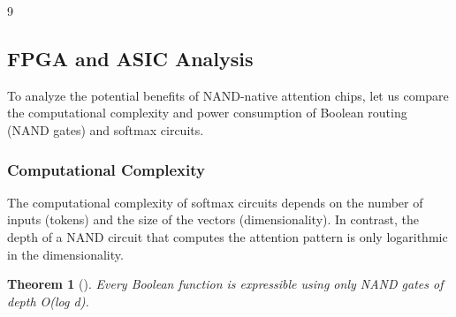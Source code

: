 \documentclass[11pt]{article}
\newtheorem{theorem}{Theorem}[section]
\theoremstyle{definition}
\begin{document}
\begin{thebibliography}{9}
\subsection{FPGA and ASIC Analysis}













To analyze the potential benefits of NAND-native attention chips, let us compare the computational complexity and power consumption of Boolean routing (NAND gates) and softmax circuits.













\subsubsection{Computational Complexity}













The computational complexity of softmax circuits depends on the number of inputs (tokens) and the size of the vectors (dimensionality). In contrast, the depth of a NAND circuit that computes the attention pattern is only logarithmic in the dimensionality.













\begin{theorem}[\cite{sheffer1913}]






Every Boolean function is expressible using only NAND gates of depth O(log d).






\end{theorem}














\end{thebibliography}
\end{document}
